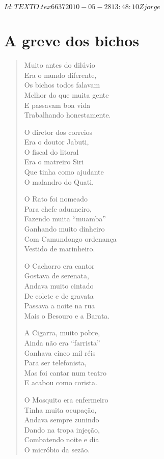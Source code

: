 \SVN $Id: TEXTO.tex 6637 2010-05-28 13:48:10Z jorge $


\chapter{A greve dos bichos}

\begin{verse}
Muito antes do dilúvio\\
Era o mundo diferente,\\
Os bichos todos falavam\\
Melhor do que muita gente\\
E passavam boa vida\\
Trabalhando honestamente.

O diretor dos correios\\
Era o doutor Jabuti,\\
O fiscal do litoral\\
Era o matreiro Siri\\
Que tinha como ajudante\\
O malandro do Quati.

O Rato foi nomeado\\
Para chefe aduaneiro,\\
Fazendo muita “muamba”\\
Ganhando muito dinheiro\\
Com Camundongo ordenança\\
Vestido de marinheiro.

O Cachorro era cantor\\
Gostava de serenata,\\
Andava muito cintado\\
De colete e de gravata\\
Passava a noite na rua\\
Mais o Besouro e a Barata.

A Cigarra, muito pobre,\\
Ainda não era “farrista”\\
Ganhava cinco mil réis\\
Para ser telefonista, \\
Mas foi cantar num teatro\\
E acabou como corista.

O Mosquito era enfermeiro\\
Tinha muita ocupação,\\
Andava sempre zunindo\\
Dando na tropa injeção,\\
Combatendo noite e dia\\
O micróbio da sezão.


\end{verse}
